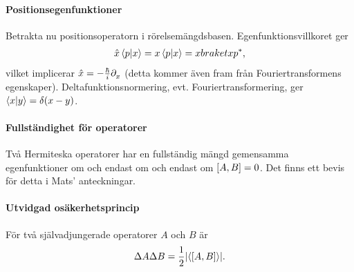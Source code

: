 \paragraph{Positionsegenfunktioner}
Betrakta nu positionsoperatorn i rörelsemängdsbasen. Egenfunktionsvillkoret ger
\begin{align*}
	\hat{x}\braket{p}{x} = x\braket{p}{x} = xbraket{x}{p}^{*},
\end{align*}
vilket implicerar $\hat{x} = -\frac{\hbar}{i}\partial_{x}^{}$ (detta kommer även fram från Fouriertransformens egenskaper). Deltafunktionsnormering, evt. Fouriertransformering, ger $\braket{x}{y} = \delta(x - y)$.

\paragraph{Fullständighet för operatorer}
Två Hermiteska operatorer har en fullständig mängd gemensamma egenfunktioner om och endast om och endast om $[A, B] = 0$. Det finns ett bevis för detta i Mats' anteckningar.

\paragraph{Utvidgad osäkerhetsprincip}
För två självadjungerade operatorer $A$ och $B$ är
\begin{align*}
	\Delta A\Delta B = \frac{1}{2}\abs{\expval{[A, B]}}.
\end{align*}

